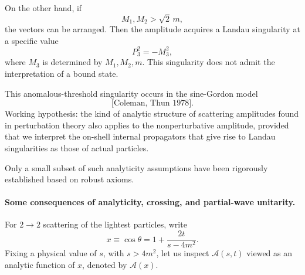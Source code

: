On the other hand, if
\[
  M_1,M_2>\sqrt2\,m,
\]
the vectors can be arranged.  Then the amplitude acquires a Landau
singularity at a specific value
\[
  P_3^2=-M_3^2,
\]
where \(M_3\) is determined by \(M_1,M_2,m\).  This singularity does not
admit the interpretation of a bound state.

\begin{center}
\end{center}

This anomalous-threshold singularity occurs in the sine-Gordon model
\[
  \text{[Coleman, Thun 1978]}.
\]
Working hypothesis: the kind of analytic structure of scattering
amplitudes found in perturbation theory also applies to the
nonperturbative amplitude, provided that we interpret the on-shell
internal propagators that give rise to Landau singularities as those of
actual particles.

Only a small subset of such analyticity assumptions have been rigorously
established based on robust axioms.

\paragraph{Some consequences of analyticity, crossing, and partial-wave
unitarity.}
For \(2\to2\) scattering of the lightest particles, write
\[
  x\equiv \cos\theta = 1+\frac{2t}{s-4m^2}.
\]
Fixing a physical value of \(s\), with \(s>4m^2\), let us inspect
\(\mathcal A(s,t)\) viewed as an analytic function of \(x\), denoted by
\(\mathcal A(x)\).

